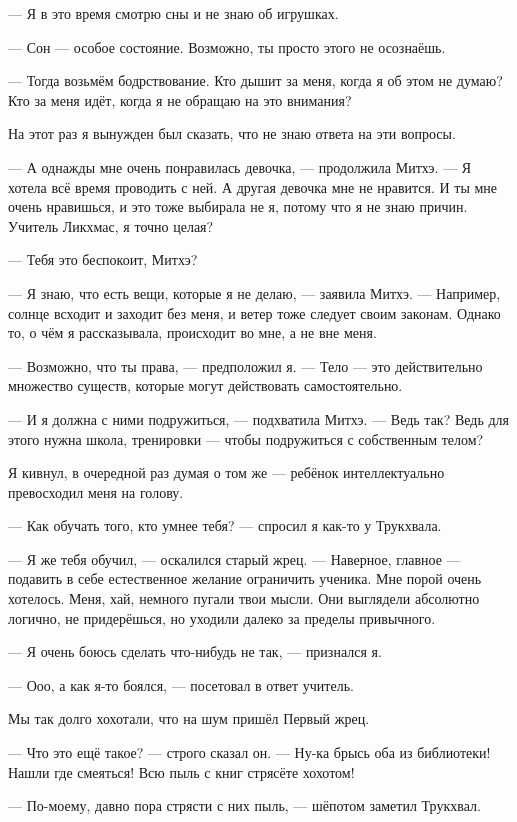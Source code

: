 --- Я в это время смотрю сны и не знаю об игрушках.

--- Сон --- особое состояние.
Возможно, ты просто этого не осознаёшь.

--- Тогда возьмём бодрствование.
Кто дышит за меня, когда я об этом не думаю?
Кто за меня идёт, когда я не обращаю на это внимания?

На этот раз я вынужден был сказать, что не знаю ответа на эти вопросы.

--- А однажды мне очень понравилась девочка, --- продолжила Митхэ.
--- Я хотела всё время проводить с ней.
А другая девочка мне не нравится.
И ты мне очень нравишься, и это тоже выбирала не я, потому что я не знаю причин.
Учитель Ликхмас, я точно целая?

--- Тебя это беспокоит, Митхэ?

--- Я знаю, что есть вещи, которые я не делаю, --- заявила Митхэ.
--- Например, солнце всходит и заходит без меня, и ветер тоже следует своим законам.
Однако то, о чём я рассказывала, происходит во мне, а не вне меня.

--- Возможно, что ты права, --- предположил я.
--- Тело --- это действительно множество существ, которые могут действовать самостоятельно.

--- И я должна с ними подружиться, --- подхватила Митхэ.
--- Ведь так?
Ведь для этого нужна школа, тренировки --- чтобы подружиться с собственным телом?

Я кивнул, в очередной раз думая о том же --- ребёнок интеллектуально превосходил меня на голову.

--- Как обучать того, кто умнее тебя? --- спросил я как-то у Трукхвала.

--- Я же тебя обучил, --- оскалился старый жрец.
--- Наверное, главное --- подавить в себе естественное желание ограничить ученика.
Мне порой очень хотелось.
Меня, хай, немного пугали твои мысли.
Они выглядели абсолютно логично, не придерёшься, но уходили далеко за пределы привычного.

--- Я очень боюсь сделать что-нибудь не так, --- признался я.

--- Ооо, а как я-то боялся, --- посетовал в ответ учитель.

Мы так долго хохотали, что на шум пришёл Первый жрец.

--- Что это ещё такое? --- строго сказал он.
--- Ну-ка брысь оба из библиотеки!
Нашли где смеяться!
Всю пыль с книг стрясёте хохотом!

--- По-моему, давно пора стрясти с них пыль, --- шёпотом заметил Трукхвал.

